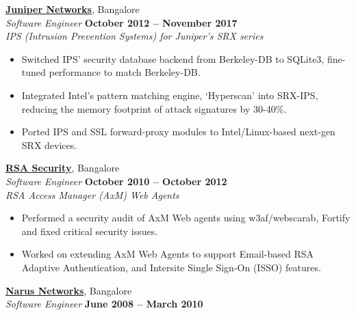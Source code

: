 \documentclass[9pt]{article}
\begin{document}
    \href{http://www.juniper.net}{\textbf{Juniper Networks}}, Bangalore \\%
    \textsl{Software Engineer} \hfill \textbf{October 2012 -- November 2017}\\%
    
	\textsl{IPS (Intrusion Prevention Systems) for Juniper's SRX series}
	\begin{itemize}
	\itemsep0em
		\item Switched IPS' security database backend from Berkeley-DB to SQLite3, fine-tuned performance to match Berkeley-DB.%
        \item Integrated Intel's pattern matching engine, `Hyperscan' into SRX-IPS, reducing the memory footprint of attack signatures by 30-40\%.%
		\item Ported IPS and SSL forward-proxy modules to Intel/Linux-based next-gen SRX devices.\vspace{1mm}\\\vspace{1mm}%
	\end{itemize}

    \href{http://www.rsa.com/}{\textbf{RSA Security}}, Bangalore \\%
    \textsl{Software Engineer} \hfill \textbf{October 2010 -- October 2012}\\%
    
	\textsl{RSA Access Manager (AxM) Web Agents}
	\begin{itemize}
	\itemsep0em
		\item Performed a security audit of AxM Web agents using w3af/webscarab, Fortify and fixed critical security issues. %
		\item Worked on extending AxM Web Agents to support Email-based RSA Adaptive Authentication, and Intersite Single Sign-On (ISSO) features.\vspace{0mm}\\\vspace{1mm}%
	\end{itemize}

    \pagebreak %

    \href{https://en.wikipedia.org/wiki/Narus_(company)}{\textbf{Narus Networks}}, Bangalore \\%
    \textsl{Software Engineer} \hfill \textbf{June 2008 -- March 2010}\\%
	
\end{document}
